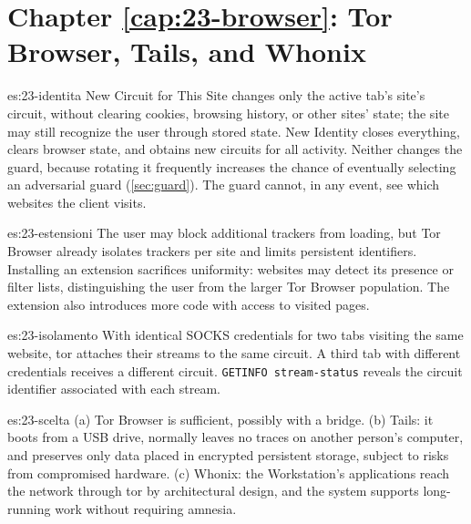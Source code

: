 \section*{Chapter \ref{cap:23-browser}: Tor Browser, Tails, and Whonix}

\begin{soluzione}{es:23-identita}
New Circuit for This Site changes only the active tab's site's circuit, without clearing cookies, browsing history, or other sites' state; the site may still recognize the user through stored state. New Identity closes everything, clears browser state, and obtains new circuits for all activity. Neither changes the guard, because rotating it frequently increases the chance of eventually selecting an adversarial guard (\cref{sec:guard}). The guard cannot, in any event, see which websites the client visits.
\end{soluzione}

\begin{soluzione}{es:23-estensioni}
The user may block additional trackers from loading, but Tor Browser already isolates trackers per site and limits persistent identifiers. Installing an extension sacrifices uniformity: websites may detect its presence or filter lists, distinguishing the user from the larger Tor Browser population. The extension also introduces more code with access to visited pages.
\end{soluzione}

\begin{soluzione}{es:23-isolamento}
With identical SOCKS credentials for two tabs visiting the same website, tor attaches their streams to the same circuit. A third tab with different credentials receives a different circuit. \texttt{GETINFO stream-status} reveals the circuit identifier associated with each stream.
\end{soluzione}

\begin{soluzione}{es:23-scelta}
(a) Tor Browser is sufficient, possibly with a bridge. (b) Tails: it boots from a USB drive, normally leaves no traces on another person's computer, and preserves only data placed in encrypted persistent storage, subject to risks from compromised hardware. (c) Whonix: the Workstation's applications reach the network through tor by architectural design, and the system supports long-running work without requiring amnesia.
\end{soluzione}


